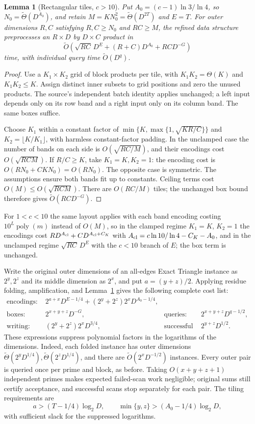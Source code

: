 \documentclass[11pt]{article}
\newtheorem{lemma}[theorem]{Lemma}
\newcommand{\softO}{\widetilde O}
\begin{document}
\begin{lemma}[Rectangular tiles, $c>10$]
\label{lem:subset-rect-tiles}
Put $A_0=(c-1)\ln3/\ln4$, so $N_0=\widetilde\Theta(D^{A_0})$,
and retain $M=KN_0^2=\widetilde\Theta(D^{2T})$ and $E=T$.
For outer dimensions $R,C$ satisfying $R,C\ge N_0$ and $RC\ge M$,
the refined data structure preprocesses an $R\times D$ by $D\times C$
product in
\[
\softO\left(\sqrt{RC}\,D^E+(R+C)D^{A_0}+RC D^{-G}\right)
\]
time, with individual query time $\softO(D^q)$.
\end{lemma}
\begin{proof}
Use a $K_1\times K_2$ grid of block products per tile, with
$K_1K_2=\Theta(K)$ and $K_1K_2\le K$. Assign distinct inner subsets
to grid positions and zero the unused products. The source's independent
batch identity applies unchanged; a left input depends only on its row
band and a right input only on its column band. The same boxes suffice.

Choose $K_1$ within a constant factor of
$\min\{K,\max\{1,\sqrt{KR/C}\}\}$ and
$K_2=\lfloor K/K_1\rfloor$, with harmless constant-factor padding.
In the unclamped case the number of bands on each side is
$O(\sqrt{RC/M})$, and their encodings cost $O(\sqrt{RCM})$.
If $R/C\ge K$, take $K_1=K,K_2=1$: the encoding cost is
$O(RN_0+CKN_0)=O(RN_0)$. The opposite case is symmetric.
The assumptions ensure both bands fit up to constants. Ceiling terms cost
$O(M)\le O(\sqrt{RCM})$. There are $O(RC/M)$ tiles; the unchanged
box bound therefore gives $\softO(RCD^{-G})$.
\end{proof}
For $1<c<10$ the same layout applies with each band encoding costing
$10^L\operatorname{poly}(m)$ instead of $O(M)$, so in the clamped regime
$K_1=K$, $K_2=1$ the encodings cost $RD^{A_{\rm cl}}+CD^{A_{\rm cl}+C_K}$
with $A_{\rm cl}=c\ln10/\ln4-C_K-A_0$, and in the unclamped regime
$\sqrt{RC}\,D^E$ with the $c<10$ branch of $E$; the box term is unchanged.

Write the original outer dimensions of an all-edges Exact Triangle
instance as $2^y,2^z$ and its middle dimension as $2^x$, and put
$a=(y+z)/2$. Applying residue folding, amplification, and
Lemma~\ref{lem:subset-rect-tiles} gives the following complete cost list:
\begin{align*}
\text{encodings: }&2^{a+x}D^{E-1/4}
 +(2^y+2^z)2^xD^{A_0-1/4},\\
\text{boxes: }&2^{x+y+z}D^{-G},
&\text{queries: }&2^{x+y+z}D^{q-1/2},\\
\text{writing: }&(2^y+2^z)2^xD^{3/4},
&\text{successful scans: }&2^{y+z}D^{1/2}.
\end{align*}
These expressions suppress polynomial factors in the logarithms of the
dimensions. Indeed, each folded instance has outer dimensions
$\widetilde\Theta(2^yD^{1/4}),\widetilde\Theta(2^zD^{1/4})$, and there
are $\widetilde O(2^xD^{-1/2})$ instances. Every outer pair is queried
once per prime and block, as before. Taking $O(x+y+z+1)$ independent
primes makes expected failed-scan work negligible; original sums still
certify acceptance, and successful scans stop separately for each pair.
The tiling requirements are
\[
a>(T-1/4)\log_2D,\qquad
\min\{y,z\}>(A_0-1/4)\log_2D,
\]
with sufficient slack for the suppressed logarithms.
\end{document}
